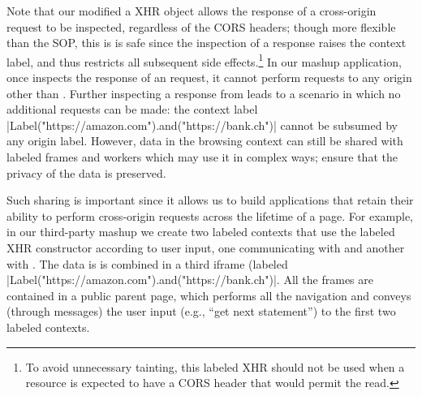 Note that our modified a XHR object allows the response of a
cross-origin request to be inspected, regardless of the CORS headers;
though more flexible than the SOP, this is is safe since the
inspection of a response raises the context label, and thus restricts
all subsequent side effects.\footnote{
  To avoid unnecessary tainting, this labeled XHR should not be used
  when a resource is expected to have a CORS header that would permit
  the read.
}
%
In our mashup application, once  inspects the
response of an  request, it cannot perform requests
to any origin other than .
%
Further inspecting a response from  leads to a scenario
in which no additional requests can be made: the context label  
\js|Label("https://amazon.com").and("https://bank.ch")|
cannot be subsumed by any origin label. 
%
However, data in the browsing context can still be shared with labeled
frames and workers which may use it in complex ways; \sys{} ensure
that the privacy of the data is preserved.
% 

Such sharing is important since it allows us to build applications
that retain their ability to perform cross-origin requests across the
lifetime of a page.
%
For example, in our third-party mashup we create two labeled contexts
that use the labeled XHR constructor according to user input, one
communicating with  and another with
.
%
The data is is combined in a third iframe (labeled
\js|Label("https://amazon.com").and("https://bank.ch")|.
%
All the frames are contained in a public parent page,
which performs all the navigation and conveys (through messages)
the user input (e.g., ``get next statement'') to the first two
labeled contexts.




